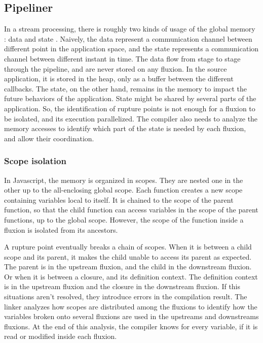 \subsection{Pipeliner} \label{section:compiler:linker} %

In a stream processing, there is roughly two kinds of usage of the global memory : data and state \cite{Fernandez2014a}.
Naively, the data represent a communication channel between different point in the application space, and the state represents a communication channel between different instant in time.
The data flow from stage to stage through the pipeline, and are never stored on any fluxion. In the source application, it is stored in the heap, only as a buffer between the different callbacks.
The state, on the other hand, remains in the memory to impact the future behaviors of the application.
State might be shared by several parts of the application.
So, the identification of rupture points is not enough for a fluxion to be isolated, and its execution parallelized.
The compiler also needs to analyze the memory accesses to identify which part of the state is needed by each fluxion, and allow their coordination.

\subsubsection{Scope isolation}

In Javascript, the memory is organized in scopes.
They are nested one in the other up to the all-enclosing global scope.
Each function creates a new scope containing variables local to itself.
It is chained to the scope of the parent function, so that the child function can access variables in the scope of the parent functions, up to the global scope.
However, the scope of the function inside a fluxion is isolated from its ancestors.

A rupture point eventually breaks a chain of scopes.
When it is between a child scope and its parent, it makes the child unable to access its parent as expected.
The parent is in the upstream fluxion, and the child in the downstream fluxion.
Or when it is between a closure, and its definition context.
The definition context is in the upstream fluxion and the closure in the downstream fluxion.
If this situations aren't resolved, they introduce errors in the compilation result.
The linker analyzes how scopes are distributed among the fluxions to identify how the variables broken onto several fluxions are used in the upstreams and downstreams fluxions.
At the end of this analysis, the compiler knows for every variable, if it is read or modified inside each fluxion.

